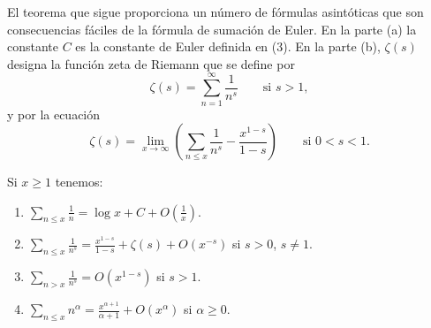 \documentclass[12pt,a4paper]{book}
\begin{document}
    El teorema que sigue proporciona un número de fórmulas asintóticas que son
    consecuencias fáciles de la fórmula de sumación de Euler. En la parte (a) la constante
    $C$ es la constante de Euler definida en (3). En la parte (b), $\zeta(s)$ designa la
    función zeta de Riemann que se define por
    \begin{equation*}
        \zeta(s)=\sum_{n=1}^{\infty}\frac{1}{n^s}\qquad\text{si } s>1,
    \end{equation*}
    y por la ecuación
    \begin{equation*}
        \zeta(s)=\lim_{x\to\infty}\left(\sum_{n\leq x}\frac{1}{n^s}-\frac{x^{1-s}}{1-s}\right)
        \qquad\text{si } 0<s<1.
    \end{equation*}

    \begin{teorema}
        Si $x\geq1$ tenemos:
        \begin{enumerate}
            \item[(a)] $\displaystyle\sum_{n\leq x}\frac{1}{n}=\log x+C+O\left(\frac{1}{x}\right)$.
            \item[(b)] $\displaystyle\sum_{n\leq x}\frac{1}{n^s}=\frac{x^{1-s}}{1-s}+\zeta(s)+O(x^{-s})$
            si $s>0$, $s\neq1$.
            \item[(c)] $\displaystyle\sum_{n>x}\frac{1}{n^s}=O(x^{1-s})$ si $s>1$.
            \item[(d)] $\displaystyle\sum_{n\leq x}n^\alpha=\frac{x^{\alpha+1}}{\alpha+1}+O(x^\alpha)$
            si $\alpha\geq0$.
        \end{enumerate}
    \end{teorema}
\end{document}
